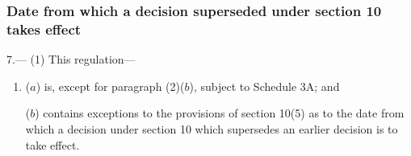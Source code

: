 \documentclass[12pt,a4paper]{article}
\begin{document}
\subsubsection[7. Date from which a decision superseded under section 10 takes effect]{Date from which a decision superseded under section 10 takes effect}

7.—%
%
(1) This regulation---
\begin{enumerate}\item[]

($a$) is, except for paragraph (2)($b$), subject to Schedule 3A; and

($b$) contains exceptions to the provisions of section 10(5) as to the date from which a decision under section 10 which supersedes an earlier decision is to take effect.
\end{enumerate}
\end{document}
